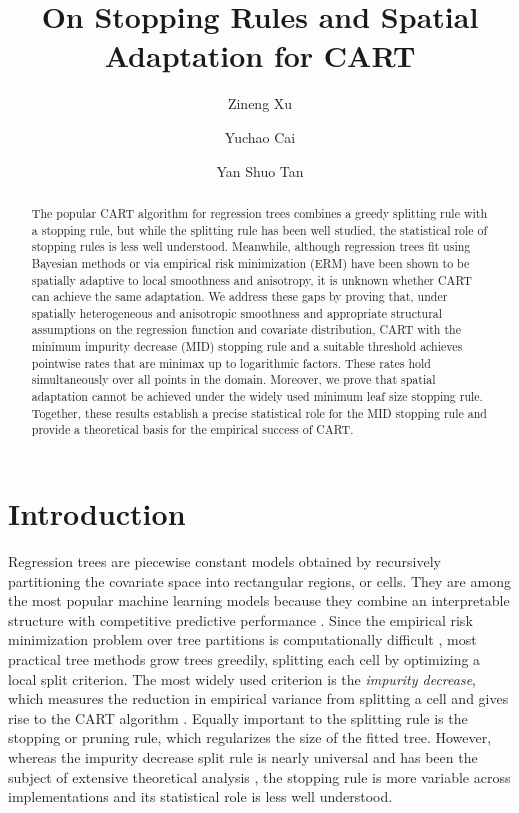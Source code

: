\documentclass[11pt]{article}
\title{On Stopping Rules and Spatial Adaptation for CART}
\author[1,*]{Zineng Xu}
\author[1,*]{Yuchao Cai}
\author[1]{Yan Shuo Tan}
\affil[1]{Department of Statistics and Data Science, National University of Singapore}
\affil[ ]{\texttt{xuzineng@u.nus.edu, yccai1123@gmail.com, yanshuo@nus.edu.sg}}
\theoremstyle{plain}
\theoremstyle{definition}
\theoremstyle{remark}
\theoremstyle{plain}
\newcommand{\1}{\mathbbm{1}}
\begin{document}
\date{}

\maketitle
\begingroup
\renewcommand{\thefootnote}{\fnsymbol{footnote}}
\endgroup

\begin{abstract}
    The popular CART algorithm for regression trees combines a greedy splitting rule with a stopping rule, but while the splitting rule has been well studied, the statistical role of stopping rules is less well understood.
    Meanwhile, although regression trees fit using Bayesian methods or via empirical risk minimization (ERM) have been shown to be spatially adaptive to local smoothness and anisotropy, it is unknown whether CART can achieve the same adaptation.
    We address these gaps by proving that, under spatially heterogeneous and anisotropic smoothness and appropriate structural assumptions on the regression function and covariate distribution, CART with the minimum impurity decrease (MID) stopping rule and a suitable threshold achieves pointwise rates that are minimax up to logarithmic factors.
    These rates hold simultaneously over all points in the domain.
    Moreover, we prove that spatial adaptation cannot be achieved under the widely used minimum leaf size stopping rule.
    Together, these results establish a precise statistical role for the MID stopping rule and provide a theoretical basis for the empirical success of CART.
\end{abstract}

\section{Introduction}

Regression trees are piecewise constant models obtained by recursively partitioning the covariate space into rectangular regions, or cells. 
They are among the most popular machine learning models because they combine an interpretable structure with competitive predictive performance \citep{hastie2009elements,rudin2019stop,rudin2022interpretable}.
Since the empirical risk minimization problem over tree partitions is computationally difficult \citep{laurent1976constructing}, most practical tree methods grow trees greedily, splitting each cell by optimizing a local split criterion. 
The most widely used criterion is the \emph{impurity decrease}, which measures the reduction in empirical variance from splitting a cell and gives rise to the CART algorithm \citep{breiman1984classification}.
Equally important to the splitting rule is the stopping or pruning rule, which regularizes the size of the fitted tree.
However, whereas the impurity decrease split rule is nearly universal and has been the subject of extensive theoretical analysis \citep{scornet2016random,klusowski2020sparse,syrgkanis2020estimation,chi2022asymptotic,klusowski2024large,Mazumder2024,cattaneo2025honest,tan2024statistical}, the stopping rule is more variable across implementations and its statistical role is less well understood.
\end{document}
